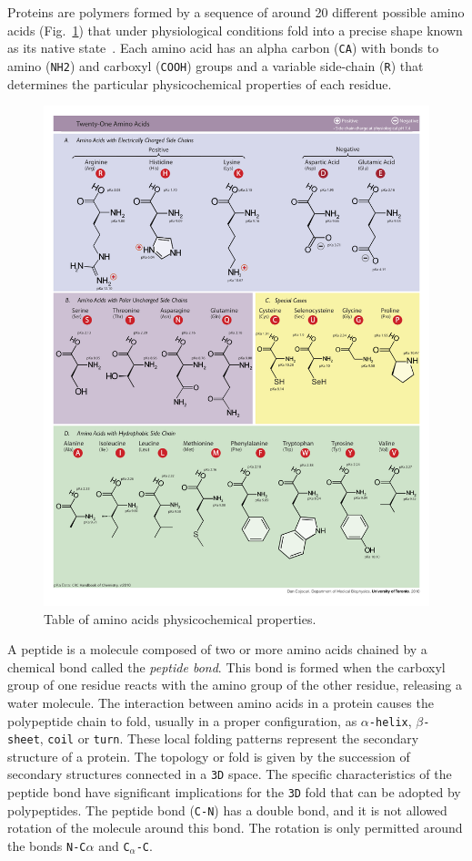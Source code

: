 \documentclass[10pt, conference]{IEEEtran}
\begin{document}
Proteins are polymers formed by a sequence of around 20 different possible amino acids (Fig.~\ref{fig:aminoacids}) that under physiological conditions fold into a precise shape known as its native state~\cite{anfinsen:1973}. Each amino acid has an alpha carbon (\texttt{CA}) with bonds to amino (\texttt{NH2}) and carboxyl (\texttt{COOH}) groups and a variable side-chain (\texttt{R}) that determines the particular physicochemical properties of each residue. 

\begin{figure}
\includegraphics[width=0.8\linewidth]{figs/Amino_Acids.png}
\caption{Table of amino acids physicochemical properties.} 
\label{fig:aminoacids}
\end{figure}

A peptide is a molecule composed of two or more amino acids chained by a chemical bond called the \textit{peptide bond}. This bond is formed when the carboxyl group of one residue reacts with the amino group of the other residue, releasing a water molecule. The interaction between amino acids in a protein causes the polypeptide chain to fold, usually in a proper configuration, as \texttt{$\alpha$-helix}, \texttt{$\beta$-sheet}, \texttt{coil} or \texttt{turn}. These local folding patterns represent the secondary structure of a protein. The topology or fold is given by the succession of secondary structures connected in a \texttt{3D} space. The specific characteristics of the peptide bond have significant implications for the \texttt{3D} fold that can be adopted by polypeptides. The peptide bond (\texttt{C-N}) has a double bond, and it is not allowed rotation of the molecule around this bond. The rotation is only permitted around the bonds \texttt{N-C$\alpha$} and \texttt{C}$_{\alpha}$\texttt{-C}. 
\end{document}
